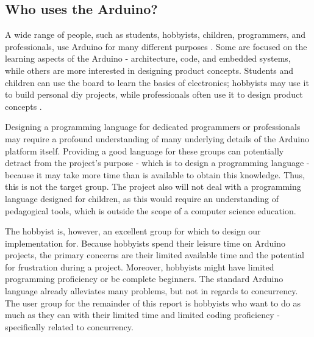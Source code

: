 \subsection{Who uses the Arduino?}\label{subsec:whouses}
A wide range of people, such as students, hobbyists, children, programmers, and professionals, use Arduino for many different purposes \cite{WhatArduino}. Some are focused on the learning aspects of the Arduino - architecture, code, and embedded systems, while others are more interested in designing product concepts. Students and children can use the board to learn the basics of electronics; hobbyists may use it to build personal \gls{diy} projects, while professionals often use it to design product concepts \cite{WhatArduino}.

Designing a programming language for dedicated programmers or professionals may require a profound understanding of many underlying details of the Arduino platform itself. Providing a good language for these groups can potentially detract from the project's purpose - which is to design a programming language - because it may take more time than is available to obtain this knowledge. Thus, this is not the target group. The project also will not deal with a programming language designed for children, as this would require an understanding of pedagogical tools, which is outside the scope of a computer science education.

The hobbyist is, however, an excellent group for which to design our implementation for. Because hobbyists spend their leisure time on Arduino projects, the primary concerns are their limited available time and the potential for frustration during a project. Moreover, hobbyists might have limited programming proficiency or be complete beginners. The standard Arduino language already alleviates many problems, but not in regards to concurrency. The user group for the remainder of this report is hobbyists who want to do as much as they can with their limited time and limited coding proficiency - specifically related to concurrency.